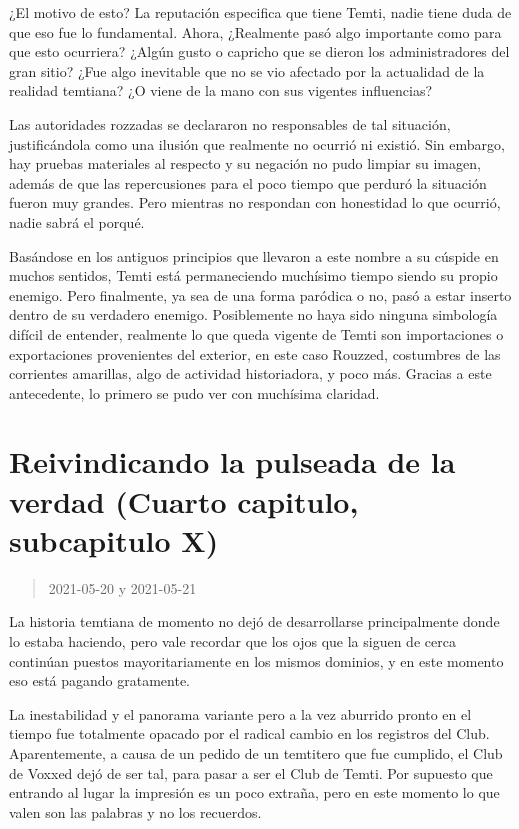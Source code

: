\documentclass[
  spanish,
]{book}
\begin{document}
¿El motivo de esto?
La reputación especifica que tiene Temti, nadie tiene duda de que eso fue lo fundamental. Ahora, ¿Realmente pasó algo importante como para que esto ocurriera? ¿Algún gusto o capricho que se dieron los administradores del gran sitio? ¿Fue algo inevitable que no se vio afectado por la actualidad de la realidad temtiana? ¿O viene de la mano con sus vigentes influencias?

Las autoridades rozzadas se declararon no responsables de tal situación, justificándola como una ilusión que realmente no ocurrió ni existió. Sin embargo, hay pruebas materiales al respecto y su negación no pudo limpiar su imagen, además de que las repercusiones para el poco tiempo que perduró la situación fueron muy grandes. Pero mientras no respondan con honestidad lo que ocurrió, nadie sabrá el porqué.

Basándose en los antiguos principios que llevaron a este nombre a su cúspide en muchos sentidos, Temti está permaneciendo muchísimo tiempo siendo su propio enemigo. Pero finalmente, ya sea de una forma paródica o no, pasó a estar inserto dentro de su verdadero enemigo. Posiblemente no haya sido ninguna simbología difícil de entender, realmente lo que queda vigente de Temti son importaciones o exportaciones provenientes del exterior, en este caso Rouzzed, costumbres de las corrientes amarillas, algo de actividad historiadora, y poco más. Gracias a este antecedente, lo primero se pudo ver con muchísima claridad.

\hypertarget{reivindicando-la-pulseada-de-la-verdad-cuarto-capitulo-subcapitulo-x}{%
\section{Reivindicando la pulseada de la verdad (Cuarto capitulo, subcapitulo X)}\label{reivindicando-la-pulseada-de-la-verdad-cuarto-capitulo-subcapitulo-x}}

\begin{quote}
2021-05-20 y 2021-05-21
\end{quote}

La historia temtiana de momento no dejó de desarrollarse principalmente donde lo estaba haciendo, pero vale recordar que los ojos que la siguen de cerca continúan puestos mayoritariamente en los mismos dominios, y en este momento eso está pagando gratamente.

La inestabilidad y el panorama variante pero a la vez aburrido pronto en el tiempo fue totalmente opacado por el radical cambio en los registros del Club. Aparentemente, a causa de un pedido de un temtitero que fue cumplido, el Club de Voxxed dejó de ser tal, para pasar a ser el Club de Temti. Por supuesto que entrando al lugar la impresión es un poco extraña, pero en este momento lo que valen son las palabras y no los recuerdos.
\end{document}
